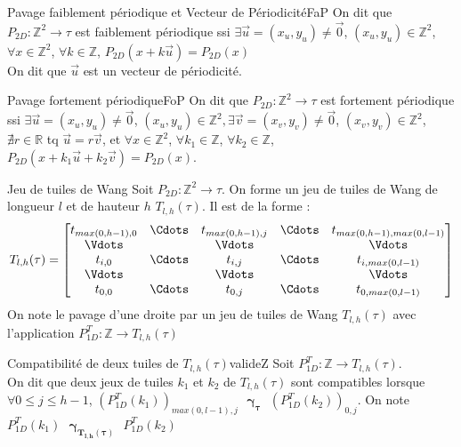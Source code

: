 \documentclass[a4paper,10pt,oneside]{article} %
\begin{document}
\begin{Definition}{Pavage faiblement périodique et Vecteur de Périodicité}{FaP}
On dit que $P_{2D} : \mathds{Z}^2 \rightarrow \tau$ est faiblement périodique ssi $\exists \Vec{u} = (x_u, y_u) \neq \Vec{0}$, $(x_u, y_u) \in \mathds{Z}^2$, $\forall x \in \mathds{Z}^2$, $\forall k \in \mathds{Z}$, {$P_{2D}(x+k\Vec{u}) = P_{2D}(x)$}\\
On dit que $\Vec{u}$ est un vecteur de périodicité.
\end{Definition}

\begin{Definition}{Pavage fortement périodique}{FoP}
On dit que $P_{2D} : \mathds{Z}^2 \rightarrow \tau$ est fortement périodique ssi $\exists \Vec{u} = (x_u, y_u) \neq \Vec{0}$, $(x_u, y_u) \in \mathds{Z}^2, \exists \Vec{v} = (x_v, y_v) \neq \Vec{0}$, $(x_v, y_v) \in \mathds{Z}^2$, $\nexists r \in \mathds{R}$ tq $\Vec{u} = r\Vec{v}$, et $\forall x \in \mathds{Z}^2$, $\forall k_1 \in \mathds{Z}$, $\forall k_2 \in \mathds{Z}$, $P_{2D}(x+k_1\Vec{u}+k_2\Vec{v}) = P_{2D}(x)$.
\end{Definition}


\begin{Definition}{Jeu de tuiles de Wang}{}
Soit $P_{2D} : \mathds{Z}^2 \rightarrow \tau$. On forme un jeu de tuiles de Wang de longueur $l$ et de hauteur $h$ $T_{l, h}(\tau)$. Il est de la forme : 
$$
T_{l, h}(\tau) = 
\begin{bmatrix}
t_{max(0,h-1),0} & \Cdots & t_{max(0,h-1),j} & \Cdots & t_{max(0,h-1),max(0,l-1)}\\
\Vdots &  & \Vdots &  & \Vdots\\
t_{i, 0} & \Cdots & t_{i,j} & \Cdots & t_{i,max(0,l-1)}\\
\Vdots &  & \Vdots &  & \Vdots\\
t_{0,0} & \Cdots & t_{0,j} & \Cdots & t_{0,max(0,l-1)}
\end{bmatrix}
$$
On note le pavage d'une droite par un jeu de tuiles de Wang $T_{l, h}(\tau)$ avec l'application $P_{1D}^T : \mathds{Z} \rightarrow T_{l, h}(\tau)$
\end{Definition}

\begin{Definition}{Compatibilité de deux tuiles de $T_{l,h}(\tau)$}{valideZ}
Soit $P_{1D}^T : \mathds{Z} \rightarrow T_{l, h}(\tau)$. \\
On dit que deux jeux de tuiles $k_1$ et $k_2$ de $T_{l, h}(\tau)$ sont compatibles lorsque $\forall 0 \leq j \leq h-1$, $(P_{1D}^T(k_1))_{max(0,l-1), j} \text{ } \bm{\gamma_{\tau}} \text{ } (P_{1D}^T(k_2))_{0, j}$. On note $ P_{1D}^T(k_1) \text{ } \bm{\gamma_{T_{l, h}(\tau)}} \text{ } P_{1D}^T(k_2)$
\end{Definition}
\end{document}
